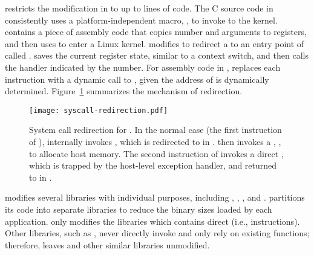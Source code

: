 \graphene{} restricts the modification in \glibc{}
to up to \gipclines{} lines of code.
The C source code in \glibc{} consistently uses a platform-independent macro,
,
to invoke \linuxapis{} to the kernel.
 contains a piece of assembly code
that copies \linuxapi{} number and arguments to registers,
and then uses  to enter a Linux kernel.
\graphene{} modifies 
to redirect a \linuxapi{} to
an entry point of \thelibos{} called .
 saves the current register state, similar to a context switch,
and then
calls the \linuxapi{} handler
indicated by the \linuxapi{} number.
For assembly code in \glibc{},
\graphene{} replaces each  instruction with
a dynamic call to
, given the address of  is dynamically determined.
Figure~\ref{fig:libos:syscall-redirection} summarizes the mechanism of \linuxapi{} redirection.


\begin{figure}[t!]
\centering
\texttt{[image: syscall-redirection.pdf]}
\footnotesize
\caption{System call redirection for \thelibos{}.
In the normal case (the first instruction of ),  internally invokes 
, which is redirected to  in \thelibos{}.\thelibos{} then invokes a \hostapi{}, , to allocate host memory. The second instruction of  invokes a direct \linuxapi{}, which is trapped by the host-level exception handler,
and returned to  in \thelibos{}.}
\label{fig:libos:syscall-redirection}
\end{figure}


\graphene{} modifies several \glibc{} libraries with individual purposes,
including , , \libpthread{}, and \libdl{}.
\Glibc{} partitions its code into separate libraries to reduce the binary sizes
loaded by each application.
\graphene{} only modifies the libraries which contains direct \linuxapis{} (i.e.,  instructions).
Other \libc{} libraries, such as ,
never directly invoke \linuxapis{} and only rely on 
existing \libc{} functions;
therefore, \graphene{} leaves  and other similar \libc{} libraries unmodified.



